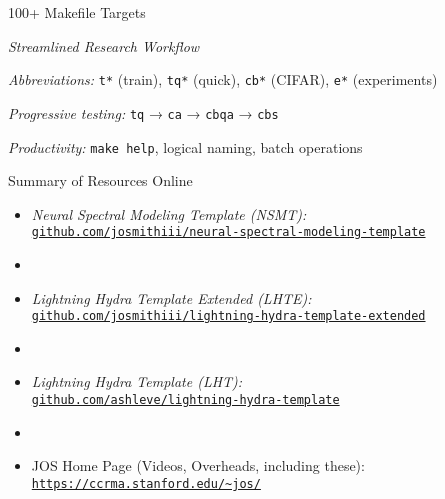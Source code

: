 \begin{slide}[\slideopts,toc={Makefile}]{100+ Makefile Targets}
  
  \emph{Streamlined Research Workflow}
  
  \begin{itemize}
    \mpitem \emph{Abbreviations:} \texttt{t*} (train), \texttt{tq*} (quick), \texttt{cb*} (CIFAR), \texttt{e*} (experiments)
    
    \mpitem \emph{Progressive testing:} \texttt{tq} → \texttt{ca} → \texttt{cbqa} → \texttt{cbs}
    
    \mpitem \emph{Productivity:} \texttt{make help}, logical naming, batch operations
  \end{itemize}
\end{slide}


\begin{slide}[\slideopts,toc={}]{Summary of Resources Online}
  \begin{itemize}
    \item \emph{Neural Spectral Modeling Template (NSMT):}\\
      \href{https://github.com/josmithiii/neural-spectral-modeling-template.git}
           {\texttt{github.com/josmithiii/neural-spectral-modeling-template}}
    \item[]
    \item \emph{Lightning Hydra Template Extended (LHTE):}\\
      \href{https://github.com/josmithiii/lightning-hydra-template-extended.git}
           {\texttt{github.com/josmithiii/lightning-hydra-template-extended}}
    \item[]
    \item \emph{Lightning Hydra Template (LHT):}\\
      \href{https://github.com/ashleve/lightning-hydra-template}
           {\texttt{github.com/ashleve/lightning-hydra-template}}
    \item[]
    \item JOS Home Page (Videos, Overheads, including these):\\
      \href{https://ccrma.stanford.edu/~jos/Welcome.html}
           {\texttt{https://ccrma.stanford.edu/\~{}jos/}}
  \end{itemize}
\end{slide}
